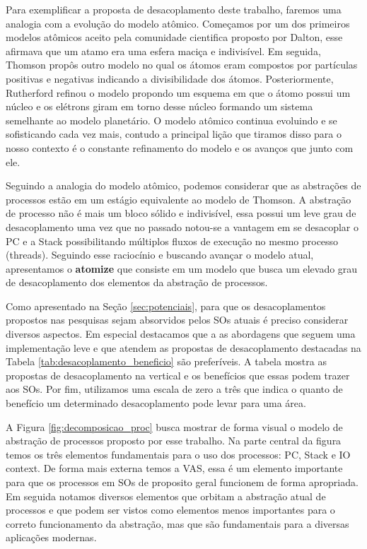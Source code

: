 Para exemplificar a proposta de desacoplamento deste trabalho, faremos uma
analogia com a evolução do modelo atômico. Começamos por um dos primeiros
modelos atômicos aceito pela comunidade cientifica proposto por Dalton, esse
afirmava que um atamo era uma esfera maciça e indivisível. Em seguida, Thomson
propôs outro modelo no qual os átomos eram compostos por partículas positivas e
negativas indicando a divisibilidade dos átomos. Posteriormente, Rutherford
refinou o modelo propondo um esquema em que o átomo possui um núcleo e os
elétrons giram em torno desse núcleo formando um sistema semelhante ao modelo
planetário. O modelo atômico continua evoluindo e se sofisticando cada vez
mais, contudo a principal lição que tiramos disso para o nosso contexto é o
constante refinamento do modelo e os avanços que junto com ele.

Seguindo a analogia do modelo atômico, podemos considerar que as abstrações de
processos estão em um estágio equivalente ao modelo de Thomson. A abstração de
processo não é mais um bloco sólido e indivisível, essa possui um leve grau de
desacoplamento uma vez que no passado notou-se a vantagem em se desacoplar o PC
e a Stack possibilitando múltiplos fluxos de execução no mesmo processo
(threads). Seguindo esse raciocínio e buscando avançar o modelo atual,
apresentamos o \textbf{atomize} que consiste em um modelo que busca um elevado
grau de desacoplamento dos elementos da abstração de processos.

Como apresentado na Seção \ref{sec:potenciais}, para que os desacoplamentos
propostos nas pesquisas sejam absorvidos pelos SOs atuais é preciso considerar
diversos aspectos. Em especial destacamos que a as abordagens que seguem uma
implementação leve e que atendem as propostas de desacoplamento destacadas na
Tabela \ref{tab:desacoplamento_beneficio} são preferíveis. A tabela mostra as
propostas de desacoplamento na vertical e os benefícios que essas podem trazer
aos SOs. Por fim, utilizamos uma escala de zero a três  que indica o
quanto de benefício um determinado desacoplamento pode levar para uma área.



A Figura \ref{fig:decomposicao_proc} busca mostrar de forma visual o modelo de
abstração de processos proposto por esse trabalho. Na parte central da figura
temos os três elementos fundamentais para o uso dos processos: PC, Stack e IO
context. De forma mais externa temos a VAS, essa é um elemento importante para
que os processos em SOs de proposito geral funcionem de forma apropriada. Em
seguida notamos diversos elementos que orbitam a abstração atual de processos e
que podem ser vistos como elementos menos importantes para o correto
funcionamento da abstração, mas que são fundamentais para a diversas aplicações
modernas.

